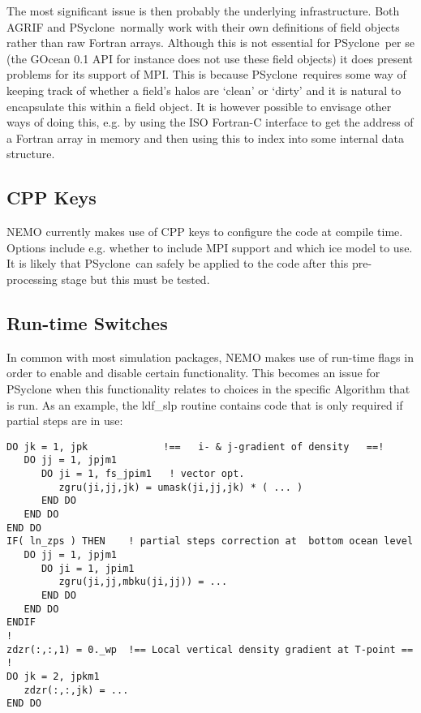 \documentclass{article}
\newcommand{\psyclone}{{PS}yclone}
\begin{document}
The most significant issue is then probably the underlying
infrastructure.  Both AGRIF and \psyclone\ normally work with their own
definitions of field objects rather than raw Fortran arrays. Although
this is not essential for \psyclone\ per se (the GOcean 0.1 API for
instance does not use these field objects) it does present problems
for its support of MPI. This is because \psyclone\ requires some way of
keeping track of whether a field's halos are `clean' or `dirty' and it
is natural to encapsulate this within a field object. It is however
possible to envisage other ways of doing this, e.g. by using the ISO
Fortran-C interface to get the address of a Fortran array in memory
and then using this to index into some internal data structure.

\subsection{CPP Keys}

NEMO currently makes use of CPP keys to configure the code at compile
time. Options include e.g. whether to include MPI support and which
ice model to use. It is likely that \psyclone\ can safely be applied to
the code after this pre-processing stage but this must be tested.

\subsection{Run-time Switches}

In common with most simulation packages, NEMO makes use of run-time
flags in order to enable and disable certain functionality. This
becomes an issue for PSyclone when this functionality relates to
choices in the specific Algorithm that is run. As an example, the
ldf\_slp routine contains code that is only required if partial steps
are in use:

\begin{verbatim}
DO jk = 1, jpk             !==   i- & j-gradient of density   ==!
   DO jj = 1, jpjm1
      DO ji = 1, fs_jpim1   ! vector opt.
         zgru(ji,jj,jk) = umask(ji,jj,jk) * ( ... )
      END DO
   END DO
END DO
IF( ln_zps ) THEN    ! partial steps correction at  bottom ocean level
   DO jj = 1, jpjm1
      DO ji = 1, jpim1
         zgru(ji,jj,mbku(ji,jj)) = ...
      END DO
   END DO
ENDIF
!
zdzr(:,:,1) = 0._wp  !== Local vertical density gradient at T-point == !
DO jk = 2, jpkm1
   zdzr(:,:,jk) = ...
END DO
\end{verbatim}
\end{document}
